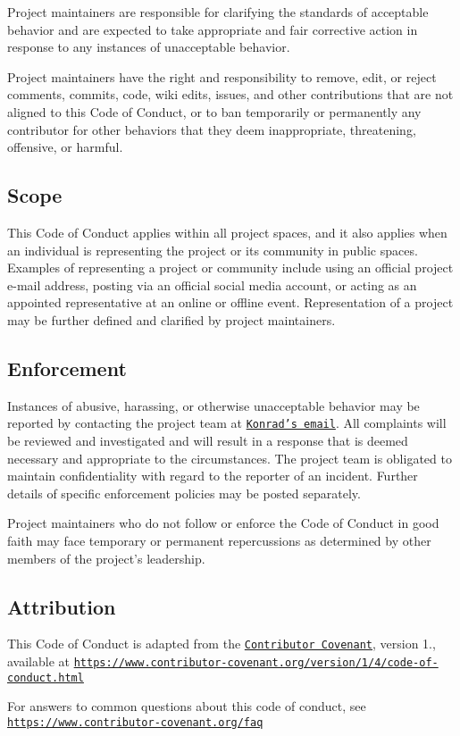 Project maintainers are responsible for clarifying the standards of acceptable behavior and are expected to take appropriate and fair corrective action in response to any instances of unacceptable behavior.

Project maintainers have the right and responsibility to remove, edit, or reject comments, commits, code, wiki edits, issues, and other contributions that are not aligned to this Code of Conduct, or to ban temporarily or permanently any contributor for other behaviors that they deem inappropriate, threatening, offensive, or harmful.

\subsection*{Scope}

This Code of Conduct applies within all project spaces, and it also applies when an individual is representing the project or its community in public spaces. Examples of representing a project or community include using an official project e-\/mail address, posting via an official social media account, or acting as an appointed representative at an online or offline event. Representation of a project may be further defined and clarified by project maintainers.

\subsection*{Enforcement}

Instances of abusive, harassing, or otherwise unacceptable behavior may be reported by contacting the project team at \href{konradwerys2@gmail.com}{\tt Konrad's email}. All complaints will be reviewed and investigated and will result in a response that is deemed necessary and appropriate to the circumstances. The project team is obligated to maintain confidentiality with regard to the reporter of an incident. Further details of specific enforcement policies may be posted separately.

Project maintainers who do not follow or enforce the Code of Conduct in good faith may face temporary or permanent repercussions as determined by other members of the project's leadership.

\subsection*{Attribution}

This Code of Conduct is adapted from the \href{https://www.contributor-covenant.org}{\tt Contributor Covenant}, version 1., available at \href{https://www.contributor-covenant.org/version/1/4/code-of-conduct.html}{\tt https\-://www.\-contributor-\/covenant.\-org/version/1/4/code-\/of-\/conduct.\-html}

For answers to common questions about this code of conduct, see \href{https://www.contributor-covenant.org/faq}{\tt https\-://www.\-contributor-\/covenant.\-org/faq} 